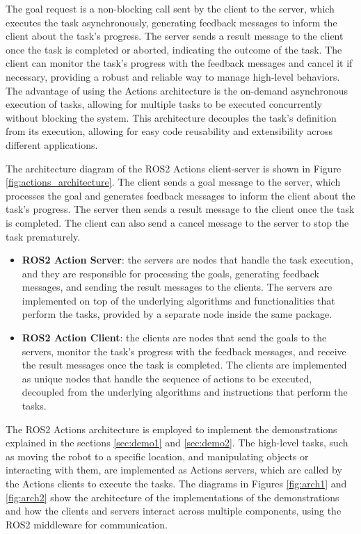 The goal request is a non-blocking call sent by the client to the server, which executes the task asynchronously,
generating feedback messages to inform the client about the task's progress. The server sends a result message
to the client once the task is completed or aborted, indicating the outcome of the task.
The client can monitor the task's progress with the feedback messages and cancel it if necessary, providing a robust 
and reliable way to manage high-level behaviors. The advantage of using the Actions architecture is the on-demand
asynchronous execution of tasks, allowing for multiple tasks to be executed concurrently without blocking the system.
This architecture decouples the task's definition from its execution, allowing for easy code reusability and extensibility
across different applications. 

The architecture diagram of the ROS2 Actions client-server is shown in Figure \ref{fig:actions_architecture}.
The client sends a goal message to the server, which processes the goal and generates feedback messages
to inform the client about the task's progress. The server then sends a result message to the client
once the task is completed. The client can also send a cancel message to the server to stop the task
prematurely.

\begin{itemize}
    \item \textbf{ROS2 Action Server}: the servers are nodes that handle the task execution, and they are responsible
    for processing the goals, generating feedback messages, and sending the result messages to the clients.
    The servers are implemented on top of the underlying algorithms and functionalities that perform the tasks,
    provided by a separate node inside the same package.
    \item \textbf{ROS2 Action Client}: the clients are nodes that send the goals to the servers, monitor the task's progress
    with the feedback messages, and receive the result messages once the task is completed. The clients are implemented
    as unique nodes that handle the sequence of actions to be executed, decoupled from the underlying algorithms
    and instructions that perform the tasks.
\end{itemize}

The ROS2 Actions architecture is employed to implement the demonstrations explained in the sections \ref{sec:demo1} and
\ref{sec:demo2}. The high-level tasks, such as moving the robot to a specific location, and manipulating objects
or interacting with them, are implemented as Actions servers, which are called by the Actions clients to execute
the tasks. The diagrams in Figures \ref{fig:arch1} and \ref{fig:arch2} show the architecture of the implementations
of the demonstrations and how the clients and servers interact across multiple components, using the 
ROS2 middleware for communication.
